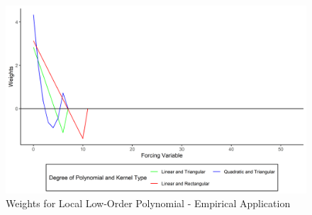 \documentclass[fleqn]{article}
\begin{document}
    
    \begin{figure}
        \centering
        \includegraphics[width = 15cm,height = 7cm]{arg1_emp_loc.png}
        \caption{Weights for Local Low-Order Polynomial - Empirical Application}
        \label{fig:arg1_emp_local}
    \end{figure}
\end{document}
